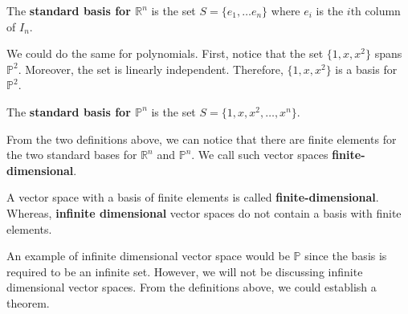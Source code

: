 \documentclass[../main.tex]{subfiles}
\begin{document}
\begin{definition}
The \textbf{standard basis for $\mathbb{R}^n$} is the set $S =
\{ e_1, \ldots e_n \}$ where $e_i$ is the $i\text{th}$ column of
$I_n$.
\end{definition}

We could do the same for polynomials. First, notice that the set
$\{ 1, x, x^2 \}$ spans $\mathbb{P}^2$. Moreover, the set is linearly
independent. Therefore, $\{ 1, x, x^2 \}$ is a basis for
$\mathbb{P}^2$.

\begin{definition}
The \textbf{standard basis for $\mathbb{P}^n$} is the set $S =
\{ 1, x, x^2, \ldots, x^n \}$.
\end{definition}

From the two definitions above, we can notice that there are finite
elements for the two standard bases for $\mathbb{R}^n$ and
$\mathbb{P}^n$. We call such vector spaces
\textbf{finite-dimensional}.

\begin{definition}
A vector space with a basis of finite elements is called
\textbf{finite-dimensional}. Whereas, \textbf{infinite dimensional}
vector spaces do not contain a basis with finite elements.
\end{definition}

An example of infinite dimensional vector space would be $\mathbb{P}$
since the basis is required to be an infinite set. However, we will
not be discussing infinite dimensional vector spaces. From the
definitions above, we could establish a theorem.
\end{document}
